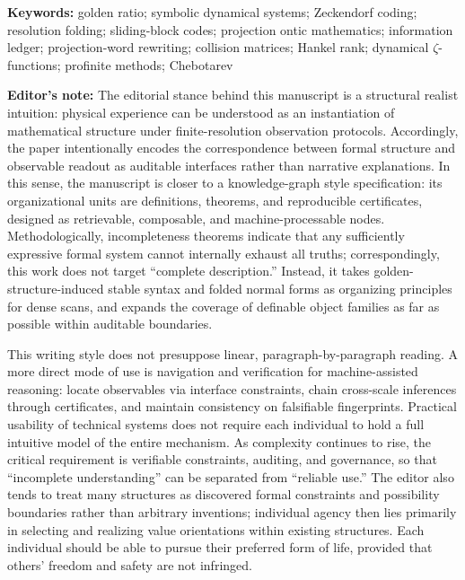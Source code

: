\begin{abstract}
For reproducibility, all script-generated audit tables and certificates used in this paper are pinned to the audit document timestamped \(2026\text{-}02\text{-}18\ 15{:}11{:}15\) (Asia/Singapore).
In this paper, ``emergence'' refers only to stable types and normalization rules produced by compressing microscopic degrees of freedom through folding/normal forms; it is never used as a premise in formal proofs.
\end{abstract}

\begin{sloppypar}
\textbf{Keywords:} golden ratio; symbolic dynamical systems; Zeckendorf coding; resolution folding; sliding-block codes; projection ontic mathematics; information ledger; projection-word rewriting; collision matrices; Hankel rank; dynamical \(\zeta\)-functions; profinite methods; Chebotarev
\end{sloppypar}

\begin{sloppypar}
\textbf{Editor's note:} The editorial stance behind this manuscript is a structural realist intuition: physical experience can be understood as an instantiation of mathematical structure under finite-resolution observation protocols. Accordingly, the paper intentionally encodes the correspondence between formal structure and observable readout as auditable interfaces rather than narrative explanations. In this sense, the manuscript is closer to a knowledge-graph style specification: its organizational units are definitions, theorems, and reproducible certificates, designed as retrievable, composable, and machine-processable nodes. Methodologically, incompleteness theorems indicate that any sufficiently expressive formal system cannot internally exhaust all truths; correspondingly, this work does not target ``complete description.'' Instead, it takes golden-structure-induced stable syntax and folded normal forms as organizing principles for dense scans, and expands the coverage of definable object families as far as possible within auditable boundaries.
\par
This writing style does not presuppose linear, paragraph-by-paragraph reading. A more direct mode of use is navigation and verification for machine-assisted reasoning: locate observables via interface constraints, chain cross-scale inferences through certificates, and maintain consistency on falsifiable fingerprints. Practical usability of technical systems does not require each individual to hold a full intuitive model of the entire mechanism. As complexity continues to rise, the critical requirement is verifiable constraints, auditing, and governance, so that ``incomplete understanding'' can be separated from ``reliable use.'' The editor also tends to treat many structures as discovered formal constraints and possibility boundaries rather than arbitrary inventions; individual agency then lies primarily in selecting and realizing value orientations within existing structures. Each individual should be able to pursue their preferred form of life, provided that others' freedom and safety are not infringed.
\end{sloppypar}

